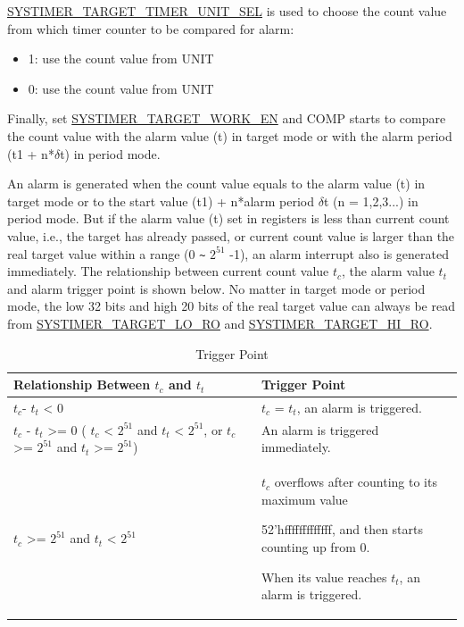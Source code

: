 \documentclass[main\_\_EN.tex]{subfiles}
\begin{document}
\hyperref[fielddesc:SYSTIMERTARGET0TIMERUNITSEL]{SYSTIMER\_TARGET\_TIMER\_UNIT\_SEL} is used to choose the count value from which timer counter to be compared for alarm:

\begin{itemize}
        \item 1: use the count value from UNIT
        \item 0: use the count value from UNIT
\end{itemize}

Finally, set \hyperref[fielddesc:SYSTIMERTARGET0WORKEN]{SYSTIMER\_TARGET\_WORK\_EN} and COMP starts to compare the count value with the alarm value (t) in target mode or with the alarm period (t1 + n*$\delta$t) in period mode.

An alarm is generated when the count value equals to the alarm value (t) in target mode or to the start value (t1) + n*alarm period $\delta$t (n = 1,2,3...) in period mode. But if the alarm value (t) set in registers is less than current count value, i.e., the target has already passed, or current count value is larger than the real target value within a range (0 \verb+~+ $2^{51}$ -1), an alarm interrupt also is generated immediately. The relationship between current count value $t_{c}$, the alarm value $t_{t}$ and alarm trigger point is shown below. No matter in target mode or period mode, the low 32 bits and high 20 bits of the real target value can always be read from \hyperref[fielddesc:SYSTIMERTARGET0LORO]{SYSTIMER\_TARGET\_LO\_RO} and  \hyperref[fielddesc:SYSTIMERTARGET0HIRO]{SYSTIMER\_TARGET\_HI\_RO}.

\begin{longtable}[c]{ | p{5cm} | p{7.5cm} |}
\caption{Trigger Point}\\\hline
\rowcolor{lightgray}
\textbf{Relationship Between $t_{c}$ and $t_{t}$} & \textbf{Trigger Point}\\ \hline
\endhead
$t_{c}$- $t_{t}$ < 0 & $t_{c}$ = $t_{t}$, an alarm is triggered.\\ \hline
$t_{c}$ - $t_{t}$ >= 0 \newline ( $t_{c}$ < $2^{51}$ and $t_{t}$ < $2^{51}$, \newline or $t_{c}$ >= $2^{51}$ and $t_{t}$ >= $2^{51}$)& An alarm is triggered immediately. \\ \hline
\multirow{3}{*}{
$t_{c}$ >= $2^{51}$ and $t_{t}$ < $2^{51}$} &

$t_{c}$ overflows after counting to its maximum value

52'hfffffffffffff, and then starts counting up from 0.

When its value reaches $t_{t}$, an alarm is triggered. \\ \hline
\end{longtable}
\end{document}
